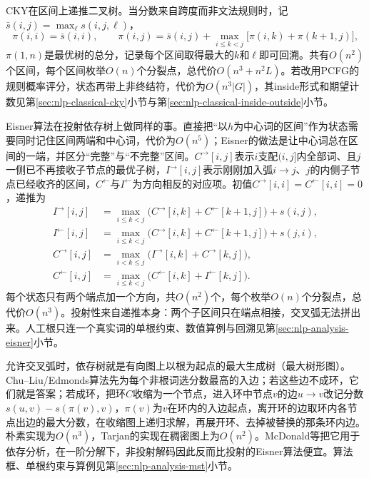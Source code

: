 CKY在区间上递推二叉树。当分数来自跨度而非文法规则时，记$\bar s(i,j)=\max_\ell s(i,j,\ell)$，
\begin{equation}
  \pi(i,i)=\bar s(i,i),\qquad
  \pi(i,j)=\bar s(i,j)+\max_{i\leq k<j}\bigl[\pi(i,k)+\pi(k+1,j)\bigr],
  \label{eq:nlp-analysis-span-cky}
\end{equation}
$\pi(1,n)$是最优树的总分，记录每个区间取得最大的$k$和$\ell$即可回溯。共有$O(n^2)$个区间，每个区间枚举$O(n)$个分裂点，总代价$O(n^3+n^2L)$。若改用PCFG的规则概率评分，状态再带上非终结符，代价为$O(n^3|G|)$，其inside形式和期望计数见第\ref{sec:nlp-classical-cky}小节与第\ref{sec:nlp-classical-inside-outside}小节。

Eisner算法在投射依存树上做同样的事。直接把“以$h$为中心词的区间”作为状态需要同时记住区间两端和中心词，代价为$O(n^5)$；Eisner的做法是让中心词总在区间的一端，并区分“完整”与“不完整”区间。$C^{\to}[i,j]$表示$i$支配$(i,j]$内全部词、且$j$一侧已不再接收子节点的最优子树，$I^{\to}[i,j]$表示刚刚加入弧$i\to j$、$j$的内侧子节点已经收齐的区间，$C^{\leftarrow}$与$I^{\leftarrow}$为方向相反的对应项。初值$C^{\to}[i,i]=C^{\leftarrow}[i,i]=0$，递推为
\begin{equation}
  \begin{aligned}
    I^{\to}[i,j]&=\max_{i\leq k<j}\bigl(C^{\to}[i,k]+C^{\leftarrow}[k+1,j]\bigr)+s(i,j),\\
    I^{\leftarrow}[i,j]&=\max_{i\leq k<j}\bigl(C^{\to}[i,k]+C^{\leftarrow}[k+1,j]\bigr)+s(j,i),\\
    C^{\to}[i,j]&=\max_{i<k\leq j}\bigl(I^{\to}[i,k]+C^{\to}[k,j]\bigr),\\
    C^{\leftarrow}[i,j]&=\max_{i\leq k<j}\bigl(C^{\leftarrow}[i,k]+I^{\leftarrow}[k,j]\bigr).
  \end{aligned}
  \label{eq:nlp-analysis-eisner}
\end{equation}
每个状态只有两个端点加一个方向，共$O(n^2)$个，每个枚举$O(n)$个分裂点，总代价$O(n^3)$。投射性来自递推本身：两个子区间只在端点相接，交叉弧无法拼出来。人工根只连一个真实词的单根约束、数值算例与回溯见第\ref{sec:nlp-analysis-eisner}小节。

允许交叉弧时，依存树就是有向图上以根为起点的最大生成树（最大树形图）。Chu–Liu/Edmonds算法先为每个非根词选分数最高的入边；若这些边不成环，它们就是答案；若成环，把环$C$收缩为一个节点，进入环中节点$v$的边$u\to v$改记分数$s(u,v)-s(\pi(v),v)$，$\pi(v)$为$v$在环内的入边起点，离开环的边取环内各节点出边的最大分数，在收缩图上递归求解，再展开环、去掉被替换的那条环内边。朴素实现为$O(n^3)$，Tarjan的实现在稠密图上为$O(n^2)$。McDonald等把它用于依存分析，在一阶分解下，非投射解码因此反而比投射的Eisner算法便宜。算法框、单根约束与算例见第\ref{sec:nlp-analysis-mst}小节。

